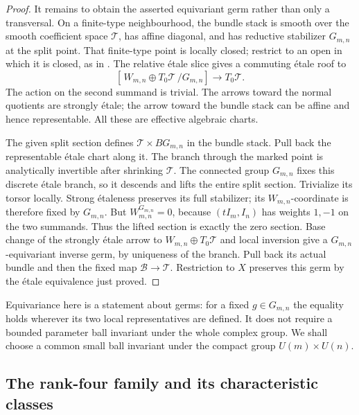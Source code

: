 \begin{proof}
It remains to obtain the asserted equivariant germ rather
than only a transversal. On a finite-type neighbourhood,
the bundle stack is smooth over the smooth coefficient space
$\mathcal T$, has affine diagonal, and has reductive stabilizer
$G_{m,n}$ at the split point. That finite-type point is locally
closed; restrict to an open in which it is closed, as in
\cite[proof of Theorem 1.1]{AHR}. The relative étale slice
\cite[Theorem 2.1 and Remark 2.3]{dCFI} gives a commuting
étale roof to
\[
 [\,W_{m,n}\oplus T_0\mathcal T\,/G_{m,n}]
                      \longrightarrow T_0\mathcal T.
\]
The action on the second summand is trivial. The arrows toward
the normal quotients are strongly étale; the arrow toward
the bundle stack can be affine and hence representable.
All these are effective algebraic charts.

The given split section defines $\mathcal T\times BG_{m,n}$
in the bundle stack. Pull back the representable étale chart
along it. The branch through the marked point is analytically
invertible after shrinking $\mathcal T$. The connected group
$G_{m,n}$ fixes this discrete étale branch, so it descends
and lifts the entire split section. Trivialize its torsor
locally. Strong étaleness preserves its full stabilizer;
its $W_{m,n}$-coordinate is therefore fixed by $G_{m,n}$.
But $W_{m,n}^{G_{m,n}}=0$, because $(tI_m,I_n)$ has weights
$1,-1$ on the two summands. Thus the lifted section is exactly
the zero section. Base change of the strongly étale arrow
to $W_{m,n}\oplus T_0\mathcal T$ and local inversion give a
$G_{m,n}$-equivariant inverse germ, by uniqueness of the
branch. Pull back its actual bundle and then the fixed map
$\mathcal B\to\mathcal T$. Restriction to $X$ preserves
this germ by the étale equivalence just proved.
\end{proof}

Equivariance here is a statement about germs: for a fixed
$g\in G_{m,n}$ the equality holds wherever its two local
representatives are defined. It does not require a bounded
parameter ball invariant under the whole complex group.
We shall choose a common small ball invariant under the
compact group $U(m)\times U(n)$.

\subsection{The rank-four family and its characteristic classes}

